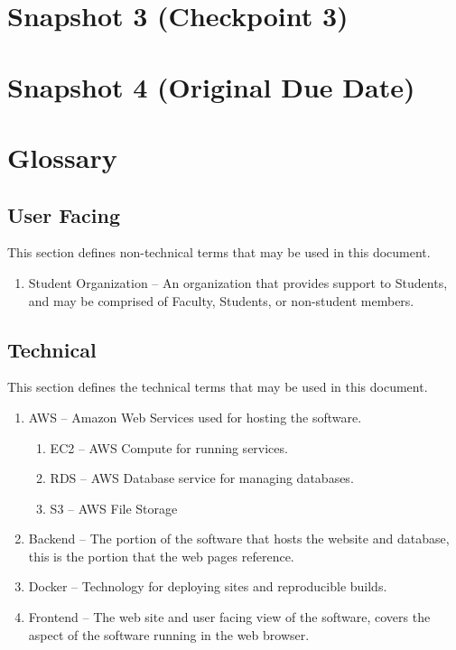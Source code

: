 \newpage %
\section {Snapshot 3 (Checkpoint 3)}
\newpage %
\section {Snapshot 4 (Original Due Date)}



\newpage %
\section{Glossary}
	\subsection{User Facing}
	This section defines non-technical terms that may be used in this document.
	\begin{enumerate}[leftmargin=3\parindent]
		\item Student Organization -- An organization that provides support to Students, and may be comprised of Faculty, Students, or non-student members.
	\end{enumerate}

	\subsection{Technical}
	This section defines the technical terms that may be used in this document.
	\begin{enumerate}[leftmargin=3\parindent]
		\item AWS -- Amazon Web Services used for hosting the software.
		\begin{enumerate}[leftmargin=3\parindent]
			\item EC2 -- AWS Compute for running services.
			\item RDS -- AWS Database service for managing databases.
			\item S3 -- AWS File Storage
		\end{enumerate}
		\item Backend -- The portion of the software that hosts the website and database, this is the portion that the web pages reference.
		\item Docker -- Technology for deploying sites and reproducible builds.
		\item Frontend -- The web site and user facing view of the software, covers the aspect of the software running in the web browser.
	\end{enumerate}

	\documentsGlossary



